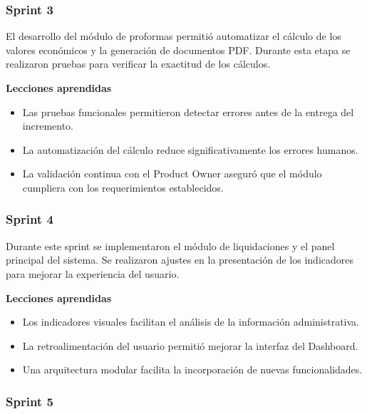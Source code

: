 \vspace{0.5cm}

\subsubsection*{Sprint 3}

El desarrollo del módulo de proformas permitió automatizar el cálculo de los valores económicos y la generación de documentos PDF. Durante esta etapa se realizaron pruebas para verificar la exactitud de los cálculos.

\textbf{Lecciones aprendidas}

\begin{itemize}
    \item Las pruebas funcionales permitieron detectar errores antes de la entrega del incremento.
    \item La automatización del cálculo reduce significativamente los errores humanos.
    \item La validación continua con el Product Owner aseguró que el módulo cumpliera con los requerimientos establecidos.
\end{itemize}

\vspace{0.5cm}

\subsubsection*{Sprint 4}

Durante este sprint se implementaron el módulo de liquidaciones y el panel principal del sistema. Se realizaron ajustes en la presentación de los indicadores para mejorar la experiencia del usuario.

\textbf{Lecciones aprendidas}

\begin{itemize}
    \item Los indicadores visuales facilitan el análisis de la información administrativa.
    \item La retroalimentación del usuario permitió mejorar la interfaz del Dashboard.
    \item Una arquitectura modular facilita la incorporación de nuevas funcionalidades.
\end{itemize}

\vspace{0.5cm}

\subsubsection*{Sprint 5}

